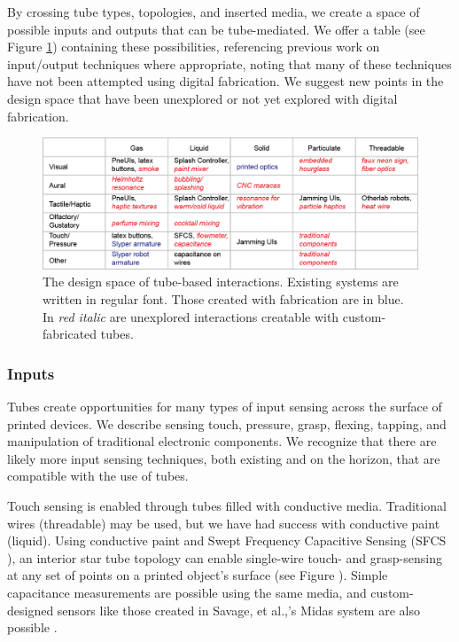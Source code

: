 By crossing tube types, topologies, and inserted media, we create a space of possible inputs and outputs that can be tube-mediated.  We offer a table (see Figure \ref{fig:designspace}) containing these possibilities, referencing previous work on input/output techniques where appropriate, noting that many of these techniques have not been attempted using digital fabrication.  We suggest new points in the design space that have been unexplored or not yet explored with digital fabrication.

\begin{figure}[t]
\centering
    \includegraphics[width=\textwidth]{figures/designspace.png}
\caption{The design space of tube-based interactions.  Existing systems are written in regular font.  Those created with fabrication are in {\color{blue}blue}. In \emph{{\color{red}red italic}} are unexplored interactions creatable with custom-fabricated tubes.}
\label{fig:designspace}
\end{figure}

\subsubsection{Inputs}

Tubes create opportunities for many types of input sensing across the surface of printed devices.  We describe sensing touch, pressure, grasp, flexing, tapping, and manipulation of traditional electronic components.  We recognize that there are likely more input sensing techniques, both existing and on the horizon, that are compatible with the use of tubes.

Touch sensing is enabled through tubes filled with conductive media.  Traditional wires (threadable) may be used, but we have had success with conductive paint (liquid).  Using conductive paint and Swept Frequency Capacitive Sensing (SFCS \cite{Sato-touche}), an interior star tube topology can enable single-wire touch- and grasp-sensing at any set of points on a printed object's surface (see Figure \cite{fig:toy}).  Simple capacitance measurements are possible using the same media, and custom-designed sensors like those created in Savage, et al.,'s Midas system are also possible \cite{Savage-midas}.


